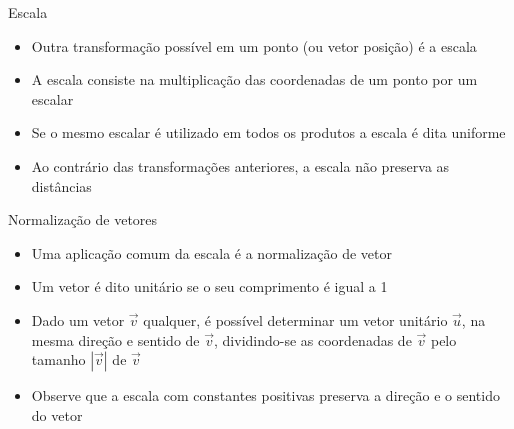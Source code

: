 \begin{frame}[fragile]{Escala}

    \begin{itemize}
        \item Outra transformação possível em um ponto (ou vetor posição) é a escala

        \item A escala consiste na multiplicação das coordenadas de um ponto por um escalar

        \item Se o mesmo escalar é utilizado em todos os produtos a escala é dita uniforme

        \item Ao contrário das transformações anteriores, a escala não preserva as distâncias

    \end{itemize}

\end{frame}

\begin{frame}[fragile]{Normalização de vetores}

    \begin{itemize}
        \item Uma aplicação comum da escala é a normalização de vetor

        \item Um vetor é dito unitário se o seu comprimento é igual a 1

        \item Dado um vetor $\vec{v}$ qualquer, é possível determinar um vetor unitário 
            $\vec{u}$, na mesma direção e sentido de $\vec{v}$, dividindo-se as coordenadas de 
            $\vec{v}$ pelo tamanho $|\vec{v}|$ de $\vec{v}$

        \item Observe que a escala com constantes positivas preserva a direção e o sentido do
            vetor

    \end{itemize}

\end{frame}
